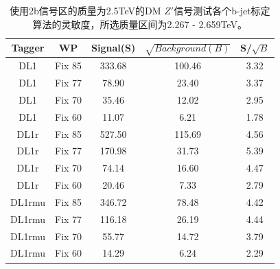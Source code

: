 \begin{table}[ht]
	\begin{center}
		\begin{tabular}{|c|c|c|c|c|}\hline
			Tagger       & WP          & Signal(S)    & $\sqrt{Background(B)}$    & S/$\sqrt{B}$ \\
			\hline
			DL1          & Fix 85      & 333.68     & 100.46        & 3.32        \\
			DL1          & Fix 77      & 78.90      & 23.40         & 3.37        \\
			DL1          & Fix 70      & 35.46      & 12.02         & 2.95        \\
			DL1          & Fix 60      & 11.07      & 6.21          & 1.78        \\
			\hline
			DL1r          & Fix 85      & 527.50      & 115.69       & 4.56        \\
			DL1r          & Fix 77      & 170.98      & 31.73        & 5.39        \\
			DL1r          & Fix 70      & 74.14       & 16.60        & 4.47        \\
			DL1r          & Fix 60      & 20.46       & 7.33         & 2.79        \\
			\hline
			DL1rmu          & Fix 85      & 346.72     & 78.48       & 4.42        \\
			DL1rmu          & Fix 77      & 116.18     & 26.19       & 4.44        \\
			DL1rmu          & Fix 70      & 55.77      & 14.72       & 3.79        \\
			DL1rmu          & Fix 60      & 14.29      & 6.24        & 2.29        \\
			\hline
		\end{tabular}
	\end{center}
	\caption{使用2b信号区的质量为2.5TeV的DM $Z\prime$信号测试各个b-jet标定算法的灵敏度，所选质量区间为2.267 - 2.659TeV。}
	\label{tab:SenZ2p5TeV}
\end{table}

